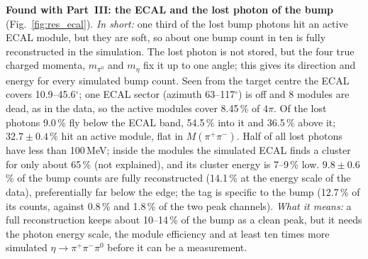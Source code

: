 \documentclass[11pt,a4paper]{article}
\newcommand{\piz}{\ensuremath{\pi^{0}}\xspace}
\newcommand{\pipi}{\ensuremath{\pi^{+}\pi^{-}}\xspace}
\newcommand{\Mpipi}{\ensuremath{M(\pi^{+}\pi^{-})}\xspace}
\begin{document}
\textbf{Found with Part~III: the ECAL and the lost photon of the bump} (Fig.~\ref{fig:res_ecal}). \emph{In short:}
one third of the lost bump photons hit an active ECAL module, but they are soft, so about one bump count in ten is fully
reconstructed in the simulation. The lost photon is not stored, but the four true charged momenta, $m_{\piz}$ and $m_\eta$
fix it up to one angle; this gives its direction and energy for every simulated bump count. Seen from the target centre the
ECAL covers 10.9--45.6$^\circ$; one ECAL sector (azimuth 63--117$^\circ$) is off and 8 modules are dead, as in the data, so
the active modules cover 8.45\,\% of $4\pi$. Of the lost photons 9.0\,\% fly below the ECAL band, 54.5\,\% into it and
36.5\,\% above it; $32.7\pm0.4$\,\% hit an active module, flat in \Mpipi. Half of all lost photons have less than 100\,MeV; inside the
modules the simulated ECAL finds a cluster for only about 65\,\% (not explained), and its cluster energy is 7--9\,\% low.
$9.8\pm0.6$\,\% of the bump counts are fully reconstructed (14.1\,\% at the energy scale of the data), preferentially far
below the edge; the tag is specific to the bump (12.7\,\% of its counts, against 0.8\,\% and 1.8\,\% of the two peak
channels). \emph{What it means:} a full reconstruction keeps about 10--14\,\% of the bump as a clean peak, but it needs the
photon energy scale, the module efficiency and at least ten times more simulated $\eta\to\pipi\piz$ before it can be a
measurement.
\end{document}
